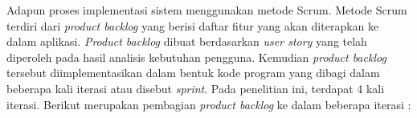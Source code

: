 \par Adapun proses implementasi sistem menggunakan metode Scrum. Metode Scrum terdiri dari \textit{product backlog} yang berisi daftar fitur yang akan diterapkan ke dalam aplikasi. \textit{Product backlog} dibuat berdasarkan \textit{user story} yang telah diperoleh pada hasil analisis kebutuhan pengguna. Kemudian \textit{product backlog} tersebut diimplementasikan dalam bentuk kode program yang dibagi dalam beberapa kali iterasi atau disebut \textit{sprint}. Pada penelitian ini, terdapat 4 kali iterasi. Berikut merupakan pembagian \textit{product backlog} ke dalam beberapa iterasi :




